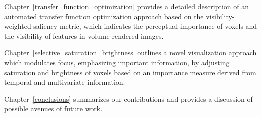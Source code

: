Chapter~\ref{transfer_function_optimization}
provides a detailed description of an automated transfer function optimization approach based on the visibility-weighted saliency metric, which indicates the perceptual importance of voxels and the visibility of features in volume rendered images.

Chapter~\ref{selective_saturation_brightness}
outlines a novel visualization approach which modulates focus, emphasizing important information, by adjusting saturation and brightness of voxels based on an importance measure derived from temporal and multivariate information.

Chapter~\ref{conclusions}
summarizes our contributions and provides a discussion of possible avenues of future work.

%
%

